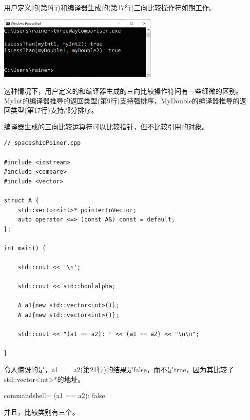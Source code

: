 用户定义的(第9行)和编译器生成的(第17行)三向比较操作符如期工作。

\begin{center}
\includegraphics[width=0.6\textwidth]{content/3/chapter4/images/28.png}\\
\end{center}

这种情况下，用户定义的和编译器生成的三向比较操作符间有一些细微的区别。MyInt的编译器推导的返回类型(第9行)支持强排序，MyDouble的编译器推导的返回类型(第17行)支持部分排序。

\begin{tcolorbox}[breakable,enhanced jigsaw,colback=red!5!white,colframe=red!75!black,title={比较指针}]

编译器生成的三向比较运算符可以比较指针，但不比较引用的对象。

\begin{lstlisting}[style=styleCXX]
// spaceshipPoiner.cpp

#include <iostream>
#include <compare>
#include <vector>

struct A {
	std::vector<int>* pointerToVector;
	auto operator <=> (const A&) const = default;
};

int main() {

	std::cout << '\n';
	
	std::cout << std::boolalpha;
	
	A a1{new std::vector<int>()};
	A a2{new std::vector<int>()};
	
	std::cout << "(a1 == a2): " << (a1 == a2) << "\n\n";

}
\end{lstlisting}

令人惊讶的是，a1 == a2(第21行)的结果是false，而不是true，因为其比较了std::vector<int>*的地址。

\begin{tcblisting}{commandshell={}}
(a1 == a2): false
\end{tcblisting}

\end{tcolorbox}

并且，比较类别有三个。


